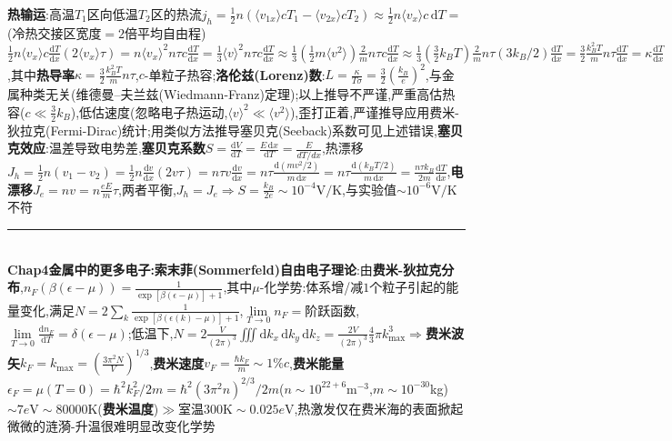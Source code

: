 \documentclass[UTF8,10pt,a4paper]{article}
\begin{document}
\begin{multicols}{2}
\textbf{热输运}:高温$T_1$区向低温$T_2$区的热流$j_h=\frac{1}{2}n(\langle v_{1x}\rangle cT_1-\langle v_{2x}\rangle cT_2)\approx\frac{1}{2}n\langle v_x\rangle c\,\mathrm{d}T=$(冷热交接区宽度$=2$倍平均自由程)$\frac{1}{2}n\langle v_x\rangle c\frac{\mathrm{d}T}{\mathrm{d}x}(2\langle v_x\rangle\tau)=n\langle v_x\rangle^2n\tau c\frac{\mathrm{d}T}{\mathrm{d}x}=\frac{1}{3}\langle v\rangle^2n\tau c\frac{\mathrm{d}T}{\mathrm{d}x}\approx\frac{1}{3}(\frac{1}{2}m\langle v^2\rangle)\frac{2}{m}n\tau c\frac{\mathrm{d}T}{\mathrm{d}x}\approx\frac{1}{3}(\frac{3}{2}k_BT)\frac{2}{m}n\tau(3k_B/2)\frac{\mathrm{d}T}{\mathrm{d}x}=\frac{3}{2}\frac{k_B^2T}{m}n\tau\frac{\mathrm{d}T}{\mathrm{d}x}=\kappa\frac{\mathrm{d}T}{\mathrm{d}x}$,其中\textbf{热导率}$\kappa=\frac{3}{2}\frac{k_B^2T}{m}n\tau$,$c$-单粒子热容;\textbf{洛伦兹(Lorenz)数}:$L=\frac{\kappa}{T\sigma}=\frac{3}{2}(\frac{k_B}{e})^2$,与金属种类无关(维德曼–夫兰兹(Wiedmann-Franz)定理);以上推导不严谨,严重高估热容($c\ll\frac{3}{2}k_B$),低估速度(忽略电子热运动,$\langle v\rangle^2\ll\langle v^2\rangle$),歪打正着,严谨推导应用费米-狄拉克(Fermi-Dirac)统计;用类似方法推导塞贝克(Seeback)系数可见上述错误,\textbf{塞贝克效应}:温差导致电势差,\textbf{塞贝克系数}$S=\frac{\mathrm{d}V}{\mathrm{d}T}=\frac{E\,\mathrm{d}x}{\mathrm{d}T}=\frac{E}{dT/dx}$,热漂移$J_h=\frac{1}{2}n(v_1-v_2)=\frac{1}{2}n\frac{\mathrm{d}v}{\mathrm{d}x}(2v\tau)=n\tau v\frac{\mathrm{d}v}{\mathrm{d}x}=n\tau\frac{\mathrm{d}(mv^2/2)}{m\,\mathrm{d}x}=n\tau\frac{\mathrm{d}(k_BT/2)}{m\,\mathrm{d}x}=\frac{n\tau k_B}{2m}\frac{\mathrm{d}T}{\mathrm{d}x}$,\textbf{电漂移}$J_e=nv=n\frac{eE}{m}\tau$,两者平衡,$J_h=J_e\Rightarrow S=\frac{k_B}{2e}\sim 10^{-4}\text{V}/\text{K}$,与实验值$\sim 10^{-6}\text{V}/\text{K}$不符\\
\rule{\columnwidth}{.2pt}\\
\textbf{Chap4金属中的更多电子:索末菲(Sommerfeld)自由电子理论}:由\textbf{费米-狄拉克分布},$n_F(\beta(\epsilon-\mu))=\frac{1}{\exp[\beta(\epsilon-\mu)]+1}$,其中$\mu$-化学势:体系增/减$1$个粒子引起的能量变化,满足$N=2\sum\limits_k\frac{1}{\exp[\beta(\epsilon(k)-\mu)]+1}$,$\lim\limits_{T\rightarrow 0}n_F=$阶跃函数,$\lim\limits_{T\rightarrow 0}\frac{\mathrm{d}n_F}{\mathrm{d}T}=\delta(\epsilon-\mu)$;低温下,$N=2\frac{V}{(2\pi)^3}\iiint\mathrm{d}k_x\,\mathrm{d}k_y\,\mathrm{d}k_z=\frac{2V}{(2\pi)^3}\frac{4}{3}\pi k_{\max}^3\Rightarrow$\textbf{费米波矢}$k_F=k_{\max}=(\frac{3\pi^2N}{V})^{1/3}$,\textbf{费米速度}$v_F=\frac{\hbar k_F}{m}\sim 1\%c$,\textbf{费米能量}$\epsilon_F=\mu(T=0)=\hbar^2k_F^2/2m=\hbar^2(3\pi^2n)^{2/3}/2m$($n\sim 10^{22+6}\text{m}^{-3}$,$m\sim 10^{-30}$kg)$\sim 7e\text{V}\sim 80000\text{K}$(\textbf{费米温度})$\gg$室温$300\text{K}\sim 0.025e\text{V}$,热激发仅在费米海的表面掀起微微的涟漪-升温很难明显改变化学势\\

\end{multicols}
\end{document}
